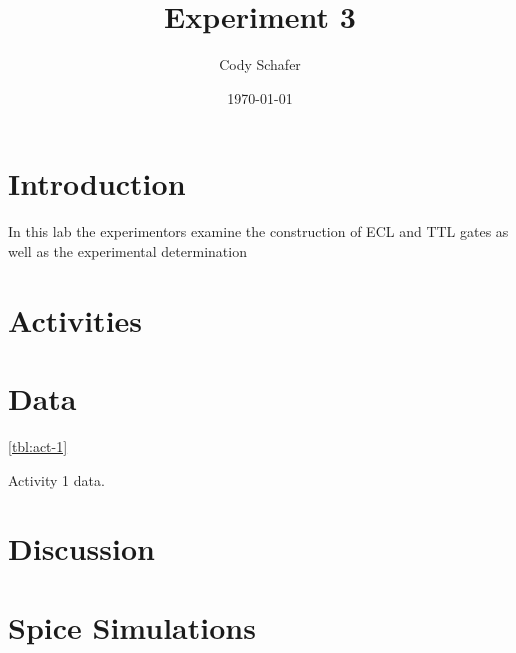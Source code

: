 \documentclass[10pt]{article}
\title{Experiment 3}
\author{Cody Schafer}
\date{\today}
\begin{document}
\maketitle
\section{Introduction}

In this lab the experimentors examine the construction of ECL and TTL
gates as well as the experimental determination

\section{Activities}
\section{Data}

\begin{table}
\DTLsettabdelimitor
{}

\ref{tbl:act-1}
\caption{Activity 1 data.}
\end{table}

\section{Discussion}


\section{Spice Simulations}
%
\end{document}
